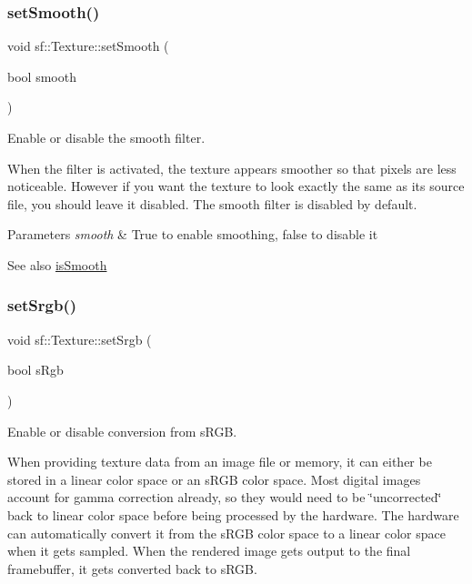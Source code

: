 \subsubsection{\texorpdfstring{setSmooth()}{setSmooth()}}
{\footnotesize\ttfamily void sf\+::\+Texture\+::set\+Smooth (\begin{DoxyParamCaption}\item[{bool}]{smooth }\end{DoxyParamCaption})}



Enable or disable the smooth filter. 

When the filter is activated, the texture appears smoother so that pixels are less noticeable. However if you want the texture to look exactly the same as its source file, you should leave it disabled. The smooth filter is disabled by default.


\begin{DoxyParams}{Parameters}
{\em smooth} & True to enable smoothing, false to disable it\\
\hline
\end{DoxyParams}
\begin{DoxySeeAlso}{See also}
\mbox{\hyperlink{classsf_1_1_texture_a3ebb050b5a71e1d40ba66eb1a060e103}{is\+Smooth}} \begin{DoxyVerb}\end{DoxyVerb}
 
\end{DoxySeeAlso}
\mbox{\label{classsf_1_1_texture_af8a38872c50a33ff074bd0865db19dd4}} 
\subsubsection{\texorpdfstring{setSrgb()}{setSrgb()}}
{\footnotesize\ttfamily void sf\+::\+Texture\+::set\+Srgb (\begin{DoxyParamCaption}\item[{bool}]{s\+Rgb }\end{DoxyParamCaption})}



Enable or disable conversion from s\+R\+GB. 

When providing texture data from an image file or memory, it can either be stored in a linear color space or an s\+R\+GB color space. Most digital images account for gamma correction already, so they would need to be \char`\"{}uncorrected\char`\"{} back to linear color space before being processed by the hardware. The hardware can automatically convert it from the s\+R\+GB color space to a linear color space when it gets sampled. When the rendered image gets output to the final framebuffer, it gets converted back to s\+R\+GB.

